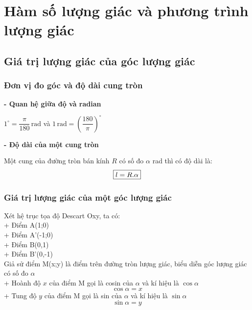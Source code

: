 \chapter{Hàm số lượng giác và phương trình lượng giác}

\section{Giá trị lượng giác của góc lượng giác}

\subsection{Đơn vị đo góc và độ dài cung tròn}

\noindent\textbf{- Quan hệ giữa độ và radian}

\begin{center}
    $1^\circ=\dfrac{\pi}{180}\, \mathrm{rad}$ và $1\, \mathrm{rad}=\left(\dfrac{180}{\pi}\right)^\circ$
\end{center}

\noindent\textbf{- Độ dài của một cung tròn}

Một cung của đường tròn bán kính $R$ có số đo $\alpha$ rad thì có độ dài là:
\[
\fbox{$l=R.\alpha$}
\]

\subsection{Giá trị lượng giác của một góc lượng giác}

\begin{minipage}[c]{0.6\textwidth}
    \raggedright
    Xét hệ trục tọa độ Descart Oxy, ta có:\\
    + Điểm A(1;0)\\
    + Điểm A'(-1;0)\\
    + Điểm B(0,1)\\
    + Điểm B'(0,-1)\\
    \vspace{5mm}
    Giả sử điểm M(x;y) là điểm trên đường tròn lượng giác, biểu diễn góc lượng giác có số đo $\alpha$\\
    + Hoành độ $x$ của điểm M gọi là cosin của $\alpha$ và kí hiệu là $\cos\alpha$
    \[
    \cos\alpha=x
    \]
    + Tung độ $y$ của điểm M gọi là sin của $\alpha$ và kí hiệu là $\sin\alpha$
    \[
    \sin\alpha=y
    \] 
    
\end{minipage}
\hfil
\begin{minipage}[c]{0.4\textwidth}
    \centering

    
\end{minipage}

